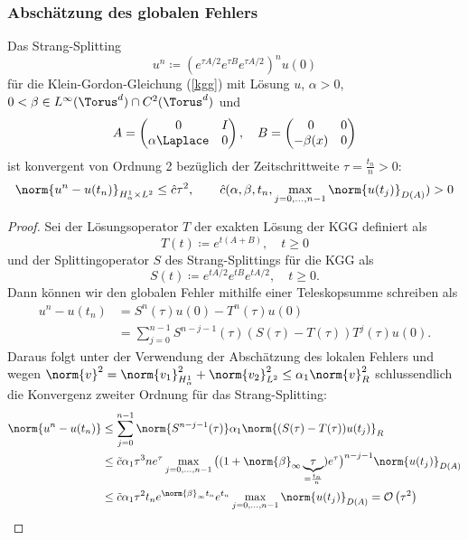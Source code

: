 \subsubsection*{Abschätzung des globalen Fehlers}
\begin{maththeorem}
Das Strang-Splitting 
\[u^n\coloneqq \left(e^{\tau A/2}e^{\tau B}e^{\tau A/2}\right)^nu(0)\]
für die Klein-Gordon-Gleichung (\ref{kgg}) mit Lösung $u$, $\alpha>0$, $0<\beta\in L^\infty(\Torus^d)\cap C^2(\Torus^d)$ und
\[A=\begin{pmatrix}0 & I\\ \alpha\Laplace & 0\end{pmatrix}, \quad B=\begin{pmatrix}0 & 0\\ -\beta(x) & 0\end{pmatrix}\]
ist konvergent von Ordnung 2 bezüglich der Zeitschrittweite $\tau=\frac{t_n}{n}>0$:
\[\norm{u^n-u(t_n)}_{H^1_\alpha\times L^2}\le \hat{c}\tau^2, \qquad \hat{c}(\alpha,\beta,t_n,\max_{j=0,\dots,n-1}\norm{u(t_j)}_{D(A)})>0\]
\end{maththeorem}
\begin{proof}
Sei der Lösungsoperator $T$ der exakten Lösung der KGG definiert als
\[T(t)\coloneqq e^{t(A+B)},\quad t\ge 0\]
und der Splittingoperator $S$ des Strang-Splittings für die KGG als
\[S(t)\coloneqq e^{tA/2}e^{tB}e^{tA/2},\quad t\ge 0.\]
Dann können wir den globalen Fehler mithilfe einer Teleskopsumme schreiben als
\begin{align*}
u^n-u(t_n)&=S^n(\tau)u(0)-T^n(\tau)u(0)\\
&=\sum_{j=0}^{n-1}S^{n-j-1}(\tau)\left(S(\tau)-T(\tau)\right)T^j(\tau)u(0).
\end{align*}
Daraus folgt unter der Verwendung der Abschätzung des lokalen Fehlers und wegen $\norm{v}^2=\norm{v_1}_{H_\alpha^1}^2+\norm{v_2}_{L^2}^2\le \alpha_1 \norm{v}_R^2$ schlussendlich die Konvergenz zweiter Ordnung für das Strang-Splitting:
\begin{align*}
\norm{u^n-u(t_n)}&\le \sum_{j=0}^{n-1}\norm{S^{n-j-1}(\tau)}\alpha_1\norm{(S(\tau)-T(\tau))u(t_j)}_R\\
&\le \tilde{c}\alpha_1\tau^3ne^\tau\max_{j=0,\dots,n-1}\big((1+\norm{\beta}_\infty\underbrace{\tau}_{=\frac{t_n}{n}})e^\tau\big)^{n-j-1}\norm{u(t_j)}_{D(A)}\\
&\le \tilde{c}\alpha_1\tau^2t_ne^{\norm{\beta}_\infty t_n}e^{t_n}\max_{j=0,\dots,n-1}\norm{u(t_j)}_{D(A)}
=\mathcal{O}\left(\tau^2\right)
\end{align*}
\end{proof}
